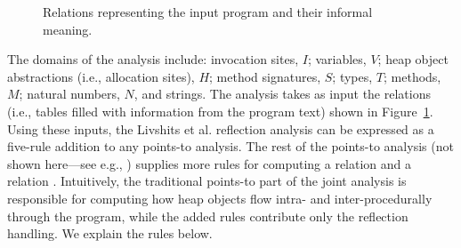 \begin{figure}[tb]
\caption{Relations representing the input program and their informal meaning.}
\label{figure:inputs}
\end{figure}


The domains of the analysis include:
invocation sites, $I$;
variables, $V$;
heap object abstractions (i.e., allocation sites), $H$;
method signatures, $S$;
types, $T$;
methods, $M$;
natural numbers, $N$, and
strings.
 The analysis takes as input the relations (i.e.,
tables filled with information from the program text) shown in
Figure~\ref{figure:inputs}.
Using these inputs, the Livshits et al. reflection analysis
can be expressed as a five-rule addition to any points-to
analysis. The rest of the points-to analysis (not shown here---see
e.g., \cite{uss/GuarnieriL09,pldi/KastrinisS13,aplas/WhaleyACL05})
supplies more rules for computing a relation  and a relation . Intuitively,
the traditional points-to part of the joint analysis is responsible
for computing how heap objects flow intra- and inter-procedurally
through the program, while the added rules contribute only the
reflection handling. We explain the rules below.

